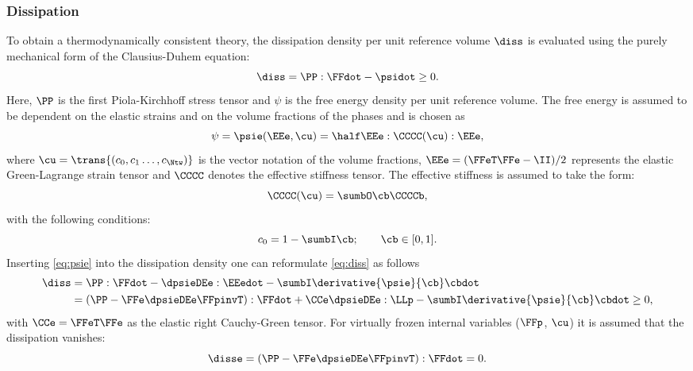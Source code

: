 \subsubsection{Dissipation} \label{sec:dissipation}
  To obtain a thermodynamically consistent theory, the  dissipation density per unit reference volume $\diss$ is evaluated using the purely mechanical form of the Clausius-Duhem equation:
  \begin{equation}
      \diss = \PP : \FFdot - \psidot \geq 0.
      \label{eq:diss}
  \end{equation}
  Here, $\PP$ is the first Piola-Kirchhoff stress tensor and $\psi$ is the free energy density per unit reference volume. The free energy is assumed to be dependent on the elastic strains and on the volume fractions of the phases and is chosen as
  \begin{equation}
    \psi = \psie(\EEe, \cu)= \half \EEe : \CCCC(\cu) : \EEe,
    \label{eq:psie}
  \end{equation}
  where $\cu=\trans{(c_0, c_1 \ldots, c_{\Ntw})}$ is the vector notation of the volume fractions, \mbox{$\EEe=(\FFeT\FFe-\II)/2$} represents the elastic Green-Lagrange strain tensor and $\CCCC$ denotes the effective stiffness tensor.
  The effective stiffness is assumed to take the form:
  \begin{equation}
    \CCCC(\cu) = \sumbO \cb \CCCCb,
    \label{eq:CCCC}
  \end{equation}
  with the following conditions:
  \begin{equation}
    c_0 = 1- \sumbI \cb; \qquad \cb \in [0,1].
    \label{eq:c_constraints}
  \end{equation}
  Inserting \cref{eq:psie} into the dissipation density one can reformulate \cref{eq:diss} as follows
  \begin{equation}
    \begin{split}
      \diss &= \PP : \FFdot - \dpsieDEe : \EEedot - \sumbI \derivative{\psie}{\cb}\cbdot\\ 
      & = \left( \PP - \FFe \dpsieDEe \FFpinvT \right) : \FFdot + \CCe \dpsieDEe : \LLp - \sumbI \derivative{\psie}{\cb}\cbdot \geq 0,
    \end{split}
    \label{eq:diss2}
  \end{equation}
  with $\CCe=\FFeT\FFe$ as the elastic right Cauchy-Green tensor. For virtually frozen internal variables ($\FFp$, $\cu$) it is assumed that the dissipation vanishes:
  \begin{equation}
      \disse = \left( \PP - \FFe \dpsieDEe \FFpinvT \right) : \FFdot = 0.
  \end{equation}
